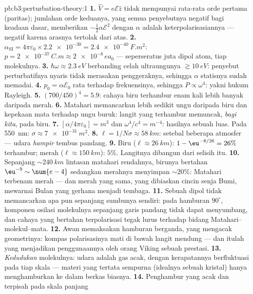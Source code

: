 \begin{solution}{pb:b3:perturbation-theory:1}
\textbf{1.} $\hat V = e\mathcal E\hat z$ tidak mempunyai rata-rata orde
pertama (paritas); jumlahan orde keduanya, yang semua penyebutnya
negatif bagi keadaan dasar, memberikan $-\tfrac12\alpha\mathcal E^2$
dengan $\alpha$ adalah keterpolarisasiannya --- negatif karena arasnya
tertolak dari atas.
\textbf{2.} $\alpha_{\text{SI}} = 4\pi\varepsilon_0 \times
\num{2.2e-30} = \qty{2.4e-40}{F.m^2}$: $p = \qty{2e-37}{C.m}
\approx \num{2e-8}\,ea_0$ --- seperseratus juta dipol atom, tiap
molekulnya.
\textbf{3.} $\hbar\omega \approx \qty{2.3}{eV}$ berbanding celah
ultraungunya $\gtrsim\qty{10}{eV}$: penyebut perturbatifnya nyaris tidak
merasakan penggeraknya, sehingga $\alpha$ statisnya sudah memadai.
\textbf{4.} $p_0 = \alpha\mathcal E_0$ rata terhadap frekuensinya, sehingga $P
\propto \omega^4$: yakni hukum Rayleigh.
\textbf{5.} $(700/450)^4 = 5.9$: cahaya biru terhambur enam kali lebih
banyak daripada merah.
\textbf{6.} Matahari memancarkan lebih sedikit ungu daripada biru dan
kepekaan mata terhadap ungu buruk: langit yang terhambur memuncak,
\emph{bagi kita}, pada biru.
\textbf{7.} $[\alpha/4\pi\varepsilon_0] = \unit{m^3}$ dan
$\omega^4/c^4 = \unit{m^{-4}}$: hasilnya sebuah luas. Pada \qty{550}{nm}:
$\sigma \approx \qty{7e-31}{m^2}$.
\textbf{8.} $\ell = 1/N\sigma \approx \qty{58}{km}$: setebal beberapa
atmosfer --- udara \emph{hampir} tembus pandang.
\textbf{9.} Biru ($\ell \approx \qty{26}{km}$): $1 -
\eu^{-8/26} = 26\%$ terhambur; merah ($\ell \approx \qty{150}{km}$):
$5\%$. Langitnya dibangun dari selisih itu.
\textbf{10.} Sepanjang $\sim\qty{240}{km}$ lintasan matahari rendahnya,
birunya bertahan $\eu^{-9} \sim \num{e-4}$ sedangkan merahnya menyimpan
$\sim20\%$: Matahari terbenam merah --- dan merah yang sama, yang
dibiaskan cincin senja Bumi, mewarnai Bulan yang gerhana menjadi
tembaga.
\textbf{11.} Sebuah dipol tidak memancarkan apa pun sepanjang sumbunya
sendiri: pada hamburan $90^\circ$, komponen osilasi molekulnya sepanjang
garis pandang tidak dapat menyumbang, dan cahaya yang bertahan
terpolarisasi tegak lurus terhadap bidang Matahari--molekul--mata.
\textbf{12.} Awan memaksakan hamburan berganda, yang mengacak
geometrinya: kompas polarisasinya mati di bawah langit mendung --- dan
itulah yang menjadikan penggunaannya oleh orang Viking sebuah prestasi.
\textbf{13.} \emph{Kedudukan} molekulnya: udara adalah gas acak, dengan
kerapatannya berfluktuasi pada tiap skala --- materi yang tertata
sempurna (idealnya sebuah kristal) hanya menghamburkan ke dalam berkas
biasnya.
\textbf{14.} Penghambur yang acak dan terpisah pada skala panjang

\end{solution}
